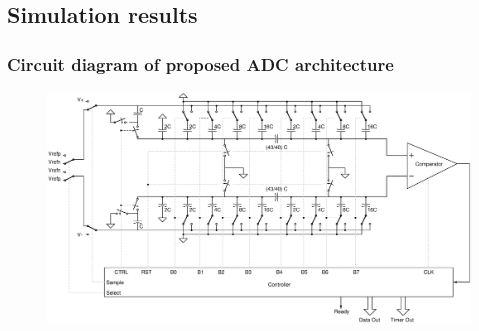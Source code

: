 \documentclass{beamer}
\begin{document}
\subsection*{Simulation results}
\begin{frame}
	\frametitle{Circuit diagram of proposed ADC architecture} \footnotesize
	\begin{center}
		\begin{figure}
			\includegraphics[width=10 cm,height=6 cm,angle=360]{Figures/15ADCfull.ps}\\
		\end{figure}
		\scriptsize{ \color{blue}{Proposed level crossing ADC circuit diagram}}
	\end{center}
\end{frame}
\end{document}
